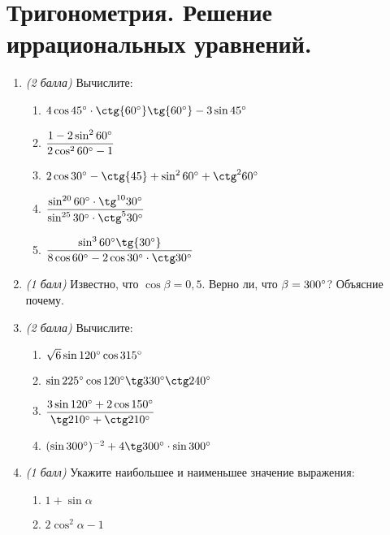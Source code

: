 \documentclass[12pt, a4paper]{article}
\begin{document}
		

\section*{Тригонометрия. Решение иррациональных уравнений.}
\begin{enumerate}
	\item \textit{(2 балла)} Вычислите:
	\begin{multicols}{2}
		\begin{enumerate}[label=\asbuk*)]
			\item $4\cos{45\degree}\cdot\ctg{60\degree}\tg{60\degree}-3\sin{45\degree}$
			\item $\dfrac{1-2\sin^2{60\degree}}{2\cos^2{60\degree}-1}$
			\item $2\cos{30\degree}-\ctg{45}+\sin^2{60\degree}+\ctg^2{60\degree}$
			\item $\dfrac{\sin^{20}{60\degree}\cdot\tg^{10}{30\degree}}{\sin^{25}{30\degree}\cdot\ctg^5{30\degree}}$
			\item $\dfrac{\sin^3{60\degree}\tg{30\degree}}{8\cos60\degree-2\cos30\degree\cdot\ctg30\degree}$
		\end{enumerate}
	\end{multicols}	
	\item \textit{(1 балл)} Известно, что $\cos{\beta}=0,5$. Верно ли, что $\beta=300\degree$? Объясние почему.
	\item \textit{(2 балла)} Вычислите:
	\begin{multicols}{2}
		\begin{enumerate}[label=\asbuk*)]
			\item $\sqrt{6}\sin120\degree\cos315\degree$
			\item $\sin225\degree\cos120\degree\tg330\degree\ctg240\degree$
			\item $\dfrac{3\sin120\degree+2\cos150\degree}{\tg210\degree+\ctg210\degree}$
			\item $(\sin300\degree)^{-2}+4\tg300\degree\cdot\sin300\degree$
		\end{enumerate}
	\end{multicols}	
	\item \textit{(1 балл)} Укажите наибольшее и наименьшее значение выражения:
	\begin{multicols}{2}
		\begin{enumerate}[label=\asbuk*)]
			\item $1+\sin\alpha$
			\item $2\cos^2{\alpha}-1$

\end{enumerate}
\end{multicols}
\end{enumerate}
\end{document}
